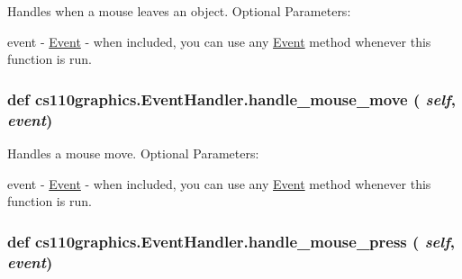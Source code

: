 Handles when a mouse leaves an object. Optional Parameters:
\begin{DoxyItemize}
\item event -\/ \hyperlink{classcs110graphics_1_1Event}{Event} -\/ when included, you can use any \hyperlink{classcs110graphics_1_1Event}{Event} method whenever this function is run. 
\end{DoxyItemize}\hypertarget{classcs110graphics_1_1EventHandler_a521fdcd170d15c0b8baa124c78b6d1ef}{
\subsubsection[{handle\_\-mouse\_\-move}]{\setlength{\rightskip}{0pt plus 5cm}def cs110graphics.EventHandler.handle\_\-mouse\_\-move ( {\em self}, \/   {\em event})}}
\label{classcs110graphics_1_1EventHandler_a521fdcd170d15c0b8baa124c78b6d1ef}


Handles a mouse move. Optional Parameters:
\begin{DoxyItemize}
\item event -\/ \hyperlink{classcs110graphics_1_1Event}{Event} -\/ when included, you can use any \hyperlink{classcs110graphics_1_1Event}{Event} method whenever this function is run. 
\end{DoxyItemize}\hypertarget{classcs110graphics_1_1EventHandler_a547873123ebcd3fcc63a2e03d2a2fee3}{
\subsubsection[{handle\_\-mouse\_\-press}]{\setlength{\rightskip}{0pt plus 5cm}def cs110graphics.EventHandler.handle\_\-mouse\_\-press ( {\em self}, \/   {\em event})}}
\label{classcs110graphics_1_1EventHandler_a547873123ebcd3fcc63a2e03d2a2fee3}


